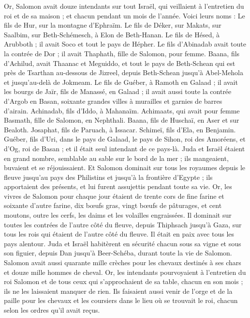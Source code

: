 \begin{multicols}{2}
Or, Salomon avait douze intendants sur tout Israël, qui veillaient à l’entretien du roi et de sa maison ; et chacun pendant un mois de l'année.
Voici leurs noms : Le fils de Hur, sur la montagne d'Ephraïm.
Le fils de Déker, sur Makats, sur Saalbim, sur Beth-Schémesch, à Elon de Beth-Hanan.
Le fils de Hésed, à Arubboth ; il avait Soco et tout le pays de Hépher.
Le fils d'Abinadab avait toute la contrée de Dor ; il avait Thaphath, fille de Salomon, pour femme.
Baana, fils d'Achilud, avait Thaanac et Meguiddo, et tout le pays de Beth-Schean qui est près de Tsarthan au-dessous de Jizreel, depuis Beth-Schean jusqu'à Abel-Mehola et jusqu'au-delà de Jokmeam.
Le fils de Guéber, à Ramoth en Galaad ; il avait les bourgs de Jaïr, fils de Manassé, en Galaad ; il avait aussi toute la contrée d'Argob en Basan, soixante grandes villes à murailles et garnies de barres d'airain.
Achinadab, fils d’Iddo, à Mahanaïm.
Achimaats, qui avait pour femme Basmath, fille de Salomon, en Nephthali.
Baana, fils de Huschaï, en Aser et sur Bealoth.
Josaphat, fils de Paruach, à Issacar.
Schimeï, fils d'Ela, en Benjamin.
Guéber, fils d'Uri, dans le pays de Galaad, le pays de Sihon, roi des Amoréens, et d’Og, roi de Basan ; et il était seul intendant de ce pays-là.
Juda et Israël étaient en grand nombre, semblable au sable sur le bord de la mer ; ils mangeaient, buvaient et se réjouissaient.
Et Salomon dominait sur tous les royaumes depuis le fleuve jusqu'au pays des Philistins et jusqu'à la frontière d'Egypte ; ils apportaient des présents, et lui furent assujettis pendant toute sa vie.
Or, les vivres de Salomon pour chaque jour étaient de trente cors de fine farine et soixante d'autre farine,
dix bœufs gras, vingt bœufs de pâturages, et cent moutons, outre les cerfs, les daims et les volailles engraissées.
Il dominait sur toutes les contrées de l’autre côté du fleuve, depuis Thiphsach jusqu'à Gaza, sur tous les rois qui étaient de l’autre côté du fleuve. Il était en paix avec tous les pays alentour.
Juda et Israël habitèrent en sécurité chacun sous sa vigne et sous son figuier, depuis Dan jusqu'à Beer-Schéba, durant toute la vie de Salomon.
Salomon avait aussi quarante mille crèches pour les chevaux destinés à ses chars et douze mille hommes de cheval.
Or, les intendants pourvoyaient à l’entretien du roi Salomon et de tous ceux qui s'approchaient de sa table, chacun en son mois ; ils ne les laissaient manquer de rien.
Ils faisaient aussi venir de l'orge et de la paille pour les chevaux et les coursiers dans le lieu où se trouvait le roi, chacun selon les ordres qu'il avait reçus.

\end{multicols}
